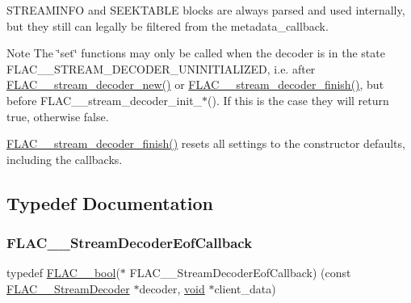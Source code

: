 S\+T\+R\+E\+A\+M\+I\+N\+FO and S\+E\+E\+K\+T\+A\+B\+LE blocks are always parsed and used internally, but they still can legally be filtered from the metadata\+\_\+callback.

\begin{DoxyNote}{Note}
The \char`\"{}set\char`\"{} functions may only be called when the decoder is in the state F\+L\+A\+C\+\_\+\+\_\+\+S\+T\+R\+E\+A\+M\+\_\+\+D\+E\+C\+O\+D\+E\+R\+\_\+\+U\+N\+I\+N\+I\+T\+I\+A\+L\+I\+Z\+ED, i.\+e. after \mbox{\hyperlink{group__flac__stream__decoder_ga7159eefc074dfbab4a37462f69326091}{F\+L\+A\+C\+\_\+\+\_\+stream\+\_\+decoder\+\_\+new()}} or \mbox{\hyperlink{group__flac__stream__decoder_gaa51bb38f762ee11b320a0839f165c5ce}{F\+L\+A\+C\+\_\+\+\_\+stream\+\_\+decoder\+\_\+finish()}}, but before F\+L\+A\+C\+\_\+\+\_\+stream\+\_\+decoder\+\_\+init\+\_\+$\ast$(). If this is the case they will return {\ttfamily true}, otherwise {\ttfamily false}.

\mbox{\hyperlink{group__flac__stream__decoder_gaa51bb38f762ee11b320a0839f165c5ce}{F\+L\+A\+C\+\_\+\+\_\+stream\+\_\+decoder\+\_\+finish()}} resets all settings to the constructor defaults, including the callbacks. 
\end{DoxyNote}


\subsection{Typedef Documentation}
\mbox{\label{group__flac__stream__decoder_ga4eac094fc609363532d90cf8374b4f7e}} 
\subsubsection{\texorpdfstring{FLAC\_\_StreamDecoderEofCallback}{FLAC\_\_StreamDecoderEofCallback}}
{\footnotesize\ttfamily typedef \mbox{\hyperlink{ordinals_8h_a95103469f1cbd78b8cf250194985b34e}{F\+L\+A\+C\+\_\+\+\_\+bool}}($\ast$ F\+L\+A\+C\+\_\+\+\_\+\+Stream\+Decoder\+Eof\+Callback) (const \mbox{\hyperlink{struct_f_l_a_c_____stream_decoder}{F\+L\+A\+C\+\_\+\+\_\+\+Stream\+Decoder}} $\ast$decoder, \mbox{\hyperlink{_s_d_l__opengles2__gl2ext_8h_ae5d8fa23ad07c48bb609509eae494c95}{void}} $\ast$client\+\_\+data)}


